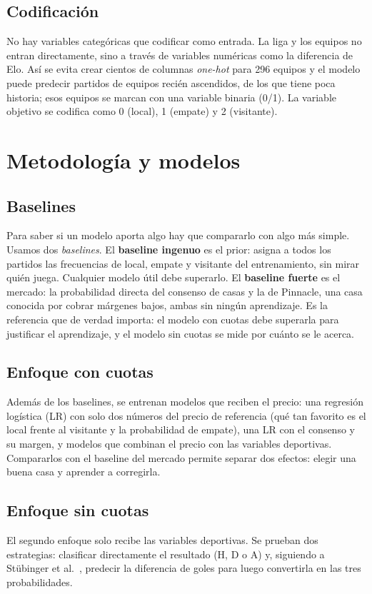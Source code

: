 \documentclass[conference]{IEEEtran}
\begin{document}
\subsection{Codificación}
No hay variables categóricas que codificar como entrada. La liga y los equipos no entran directamente, sino a través de variables numéricas como la diferencia de Elo. Así se evita crear cientos de columnas \emph{one-hot} para 296 equipos y el modelo puede predecir partidos de equipos recién ascendidos, de los que tiene poca historia; esos equipos se marcan con una variable binaria (0/1). La variable objetivo se codifica como 0 (local), 1 (empate) y 2 (visitante).

\section{Metodología y modelos}
\label{sec:modelos}
\subsection{Baselines}
Para saber si un modelo aporta algo hay que compararlo con algo más simple. Usamos dos \emph{baselines}. El \textbf{baseline ingenuo} es el prior: asigna a todos los partidos las frecuencias de local, empate y visitante del entrenamiento, sin mirar quién juega. Cualquier modelo útil debe superarlo. El \textbf{baseline fuerte} es el mercado: la probabilidad directa del consenso de casas y la de Pinnacle, una casa conocida por cobrar márgenes bajos, ambas sin ningún aprendizaje. Es la referencia que de verdad importa: el modelo con cuotas debe superarla para justificar el aprendizaje, y el modelo sin cuotas se mide por cuánto se le acerca.

\subsection{Enfoque con cuotas}
Además de los baselines, se entrenan modelos que reciben el precio: una regresión logística (LR) con solo dos números del precio de referencia (qué tan favorito es el local frente al visitante y la probabilidad de empate), una LR con el consenso y su margen, y modelos que combinan el precio con las variables deportivas. Compararlos con el baseline del mercado permite separar dos efectos: elegir una buena casa y aprender a corregirla.

\subsection{Enfoque sin cuotas}
El segundo enfoque solo recibe las variables deportivas. Se prueban dos estrategias: clasificar directamente el resultado (H, D o A) y, siguiendo a Stübinger et al.~\cite{stubinger2020}, predecir la diferencia de goles para luego convertirla en las tres probabilidades.
\end{document}
